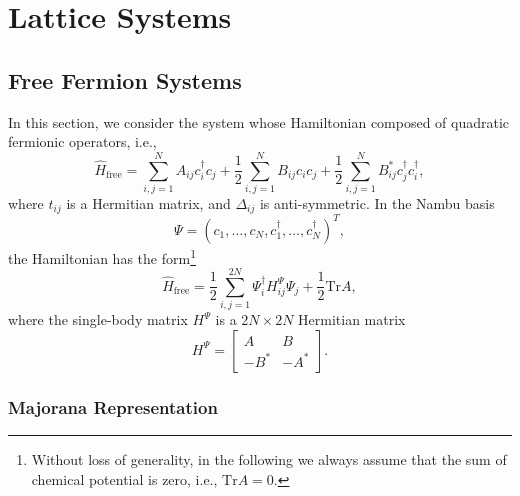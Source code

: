 \chapter{Lattice Systems}

\section{Free Fermion Systems}
In this section, we consider the system whose Hamiltonian composed of quadratic fermionic operators, i.e.,
\begin{equation}
	\hat H_{\mathrm{free}} = \sum_{i,j=1}^N A_{ij} c_i^\dagger c_j + \frac{1}{2}\sum_{i,j=1}^N B_{ij} c_i c_j + \frac{1}{2}\sum_{i,j=1}^N B_{ij}^* c_j^\dagger c_i^\dagger, \label{eq:lattice-free-fermion-hamiltonian}
\end{equation}
where $t_{ij}$ is a Hermitian matrix, and $\Delta_{ij}$ is anti-symmetric.
In the Nambu basis 
\begin{equation}
	\Psi = (c_1,\dots,c_N,c_1^\dagger,\dots,c_N^\dagger)^T,
\end{equation}
the Hamiltonian has the form\footnote{Without loss of generality, in the following we always assume that the sum of chemical potential is zero, i.e., $\mathrm{Tr} A=0$.}
\begin{equation}
	\hat H_{\mathrm{free}} = \frac{1}{2} \sum_{i,j=1}^{2N} \Psi^\dagger_i H_{ij}^{\Psi} \Psi_j + \frac{1}{2}\mathrm{Tr}A,
\end{equation}
where the single-body matrix $H^{\Psi}$ is a $2N\times 2N$ Hermitian matrix
\begin{equation}
	H^{\Psi} = \left[\begin{array}{cc} 
		A & B \\
		-B^* & -A^* 
	\end{array}\right].
\end{equation}

\subsection{Majorana Representation}

